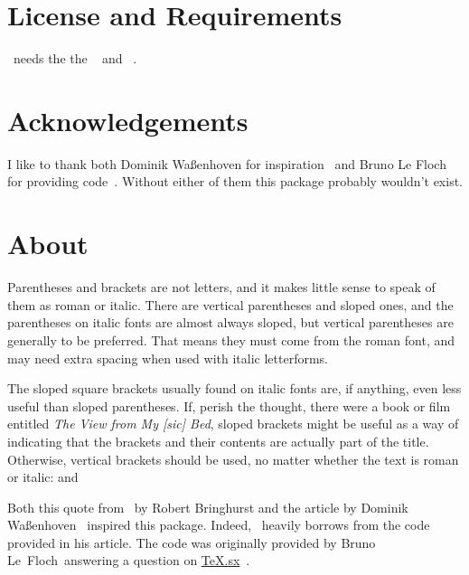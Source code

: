 \documentclass[load-preamble+]{cnltx-doc}
\begin{document}
\section{License and Requirements}
\license

\embrac\ needs the the ~\cite{bnd:l3kernel} and
~\cite{bnd:l3packages}.

\section{Acknowledgements}
I like to thank both Dominik Waßenhoven for inspiration~\cite{dtk12-dw} and
Bruno Le Floch for providing code~\cite{lefloch11}. Without either of them this
package probably wouldn't exist.

\section{About}\label{sec:about}
\begin{cnltxquote}
  Parentheses and brackets are not letters, and it makes little sense to speak
  of them as roman or italic.  There are vertical parentheses and sloped ones,
  and the parentheses on italic fonts are almost always sloped, but vertical
  parentheses are generally to be preferred.  That means they must come from
  the roman font, and may need extra spacing when used with italic
  letterforms.
 
  The sloped square brackets usually found on italic fonts are, if anything,
  even less useful than sloped parentheses.  If, perish the thought, there
  were a book or film entitled \emph*{The View from My [sic] Bed}, sloped
  brackets might be useful as a way of indicating that the brackets and their
  contents are actually part of the title.  Otherwise, vertical brackets
  should be used, no matter whether the text is roman or italic:
   and 
\end{cnltxquote}

Both this quote from~ by Robert Bringhurst and the
article  by Dominik Waßenhoven~\cite{dtk12-dw} inspired
this package.  Indeed, \embrac\ heavily borrows from the code
\citeauthor{dtk12-dw} provided in his article\manythanks. The code was
originally provided by Bruno Le~Floch\manythanks\ answering a question on
\href{http://tex.stackexchange.com}{TeX.sx}~\cite{lefloch11}.
\end{document}
